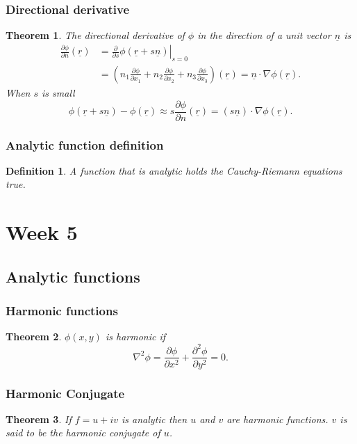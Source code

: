 \documentclass{article}
\newtheorem{theorem}{Theorem}
\newtheorem{definition}{Definition}
\begin{document}
\subsubsection{Directional derivative}
\begin{theorem}
    The directional derivative of $\phi$ in the direction of a unit vector $\underline{n}$ is
    \begin{align}
        \frac{\partial \phi}{\partial n}(\underline{r}) &= \left.\frac{\partial}{\partial s}\phi(\underline{r}+s\underline{n})\right\vert_{s=0} \\
        &= \left( n_1\frac{\partial \phi}{\partial x_1} + n_2\frac{\partial \phi}{\partial x_2} + n_3\frac{\partial \phi}{\partial x_3} \right)(\underline{r})=\underline{n}\cdot\nabla\phi(\underline{r}).
    \end{align}
    When $s$ is small
    \begin{equation}
        \phi(\underline{r}+s\underline{n})-\phi(\underline{r})\approx s\frac{\partial \phi}{\partial n}(\underline{r}) = (s\underline{n})\cdot\nabla\phi(\underline{r}).
    \end{equation}
\end{theorem}
\subsubsection{Analytic function definition}
\begin{definition}
    A function that is analytic holds the Cauchy-Riemann equations true.
\end{definition}

\section{Week 5}
\subsection{Analytic functions}
\subsubsection{Harmonic functions}
\begin{theorem}
    $\phi(x,y)$ is harmonic if
    \begin{equation}
        \nabla^2\phi = \frac{\partial \phi}{\partial x^2} + \frac{\partial^2 \phi}{\partial y^2} = 0.
    \end{equation}
\end{theorem}
\subsubsection{Harmonic Conjugate}
\begin{theorem}
    If $f=u+iv$ is analytic then $u$ and $v$ are harmonic functions. $v$ is said to be the harmonic conjugate of $u$.
\end{theorem}
\end{document}
